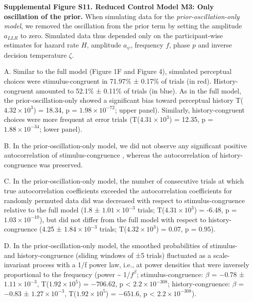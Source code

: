 \documentclass[
]{article}
\begin{document}
\textbf{Supplemental Figure S11. Reduced Control Model M3: Only
oscillation of the prior.} When simulating data for the
\emph{prior-oscillation-only model}, we removed the oscillation from the
prior term by setting the amplitude \(a_{LLR}\) to zero. Simulated data
thus depended only on the participant-wise estimates for hazard rate
\(H\), amplitude \(a_{\psi}\), frequency \(f\), phase \(p\) and inverse
decision temperature \(\zeta\).

A. Similar to the full model (Figure 1F and Figure 4), simulated
perceptual choices were stimulus-congruent in 71.97\% ± 0.17\% of trials
(in red). History-congruent amounted to 52.1\% ± 0.11\% of trials (in
blue). As in the full model, the prior-oscillation-only showed a
significant bias toward perceptual history
T(\ensuremath{4.32\times 10^{3}}) = 18.34, p =
\(\ensuremath{1.98\times 10^{-72}}\); upper panel). Similarly,
history-congruent choices were more frequent at error trials
(T(\ensuremath{4.31\times 10^{3}}) = 12.35, p =
\(\ensuremath{1.88\times 10^{-34}}\); lower panel).

B. In the prior-oscillation-only model, we did not observe any
significant positive autocorrelation of stimulus-congruence , whereas
the autocorrelation of history-congruence was preserved.

C. In the prior-oscillation-only model, the number of consecutive trials
at which true autocorrelation coefficients exceeded the autocorrelation
coefficients for randomly permuted data did was decreased with respect
to stimulus-congruence relative to the full model (1.8 ±
\ensuremath{1.01\times 10^{-3}} trials;
T(\ensuremath{4.31\times 10^{3}}) = -6.48, p =
\(\ensuremath{1.03\times 10^{-10}}\)), but did not differ from the full
model with respect to history-congruence (4.25 ±
\ensuremath{1.84\times 10^{-3}} trials;
T(\ensuremath{4.32\times 10^{3}}) = 0.07, p = \(0.95\)).

D. In the prior-oscillation-only model, the smoothed probabilities of
stimulus- and history-congruence (sliding windows of ±5 trials)
fluctuated as a scale-invariant process with a 1/f power law, i.e., at
power densities that were inversely proportional to the frequency (power
\textasciitilde{} 1/\(f^\beta\); stimulus-congruence: \(\beta\) =
\(-0.78\) ± \(\ensuremath{1.11\times 10^{-3}}\),
T(\(\ensuremath{1.92\times 10^{5}}\)) = \(-706.62\), p < \(\ensuremath{2.2\times 10^{-308}}\);
history-congruence: \(\beta\) = \(-0.83\) ±
\(\ensuremath{1.27\times 10^{-3}}\),
T(\(\ensuremath{1.92\times 10^{5}}\)) = \(-651.6\), p < \(\ensuremath{2.2\times 10^{-308}}\)).
\end{document}
